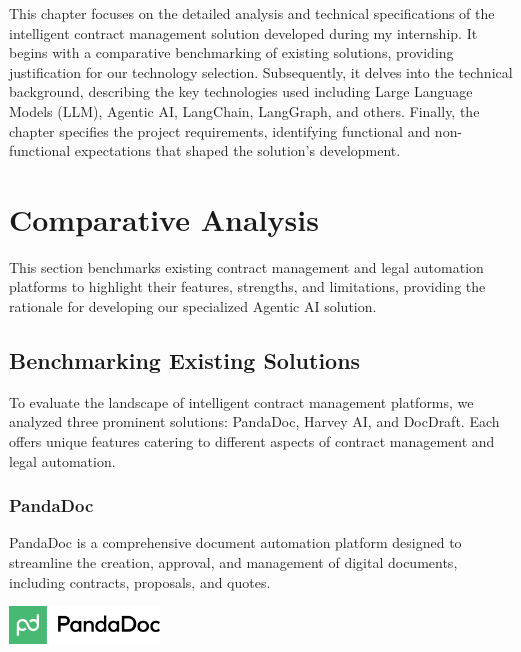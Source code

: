 This chapter focuses on the detailed analysis and technical specifications of the intelligent contract management solution developed during my internship. It begins with a comparative benchmarking of existing solutions, providing justification for our technology selection. Subsequently, it delves into the technical background, describing the key technologies used including Large Language Models (LLM), Agentic AI, LangChain, LangGraph, and others. Finally, the chapter specifies the project requirements, identifying functional and non-functional expectations that shaped the solution's development.

\newpage
{}
\hypertarget{secondchapter}{}
\section{Comparative Analysis}

This section benchmarks existing contract management and legal automation platforms to highlight their features, strengths, and limitations, providing the rationale for developing our specialized Agentic AI solution.

\subsection{Benchmarking Existing Solutions}
To evaluate the landscape of intelligent contract management platforms, we analyzed three prominent solutions: PandaDoc, Harvey AI, and DocDraft. Each offers unique features catering to different aspects of contract management and legal automation.

\subsubsection{PandaDoc}
PandaDoc is a comprehensive document automation platform designed to streamline the creation, approval, and management of digital documents, including contracts, proposals, and quotes.\mynewline

\begin{center}
    \centering
    \includegraphics[width=0.3\textwidth]{Images/PandaDoc_logo.png}
     \cite{pandadoc}
    \label{fig:pandadoc}
\end{center}

